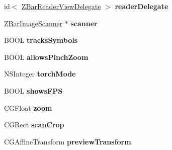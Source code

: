 \begin{DoxyCompactItemize}
\item 
\hypertarget{interface_z_bar_reader_view_a072857abb418586ed84a9575a0591ece}{
id$<$ \hyperlink{protocol_z_bar_reader_view_delegate-p}{ZBarReaderViewDelegate} $>$ {\bfseries readerDelegate}}
\label{interface_z_bar_reader_view_a072857abb418586ed84a9575a0591ece}

\item 
\hypertarget{interface_z_bar_reader_view_a95b51fe3fa1be8f1b21b74171db147c7}{
\hyperlink{interface_z_bar_image_scanner}{ZBarImageScanner} $\ast$ {\bfseries scanner}}
\label{interface_z_bar_reader_view_a95b51fe3fa1be8f1b21b74171db147c7}

\item 
\hypertarget{interface_z_bar_reader_view_a714c8790e47e59f34b281028fbf1cd42}{
BOOL {\bfseries tracksSymbols}}
\label{interface_z_bar_reader_view_a714c8790e47e59f34b281028fbf1cd42}

\item 
\hypertarget{interface_z_bar_reader_view_acc3f6bb6d33d590c6891dd9ad0d553a0}{
BOOL {\bfseries allowsPinchZoom}}
\label{interface_z_bar_reader_view_acc3f6bb6d33d590c6891dd9ad0d553a0}

\item 
\hypertarget{interface_z_bar_reader_view_aee25814ddfc09233607613db1b2e4744}{
NSInteger {\bfseries torchMode}}
\label{interface_z_bar_reader_view_aee25814ddfc09233607613db1b2e4744}

\item 
\hypertarget{interface_z_bar_reader_view_a94230513018004476b3c787a98c55f6b}{
BOOL {\bfseries showsFPS}}
\label{interface_z_bar_reader_view_a94230513018004476b3c787a98c55f6b}

\item 
\hypertarget{interface_z_bar_reader_view_a24eef7ab69fe3619d8d12cfb656c100e}{
CGFloat {\bfseries zoom}}
\label{interface_z_bar_reader_view_a24eef7ab69fe3619d8d12cfb656c100e}

\item 
\hypertarget{interface_z_bar_reader_view_a672c3f6de2f50dc96c875c830a8c34ec}{
CGRect {\bfseries scanCrop}}
\label{interface_z_bar_reader_view_a672c3f6de2f50dc96c875c830a8c34ec}

\item 
\hypertarget{interface_z_bar_reader_view_ad9a46f92ba9cdefbb8e9b4de57c6f96e}{
CGAffineTransform {\bfseries previewTransform}}
\label{interface_z_bar_reader_view_ad9a46f92ba9cdefbb8e9b4de57c6f96e}


\end{DoxyCompactItemize}
